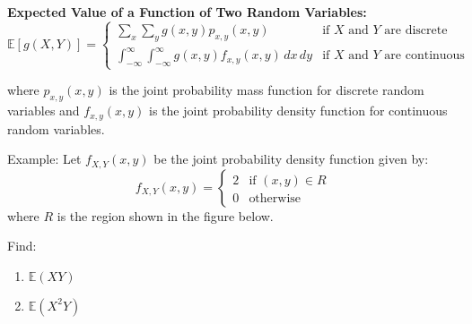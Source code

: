 \documentclass{article}
\begin{document}
    \textbf{Expected Value of a Function of Two Random Variables:}
    \[\mathbb{E}[g(X,Y)] = \begin{cases}
        \displaystyle\sum_{x} \sum_{y} g(x,y)p_{x,y}(x,y) & \text{if } X \text{ and } Y \text{ are discrete} \\[2ex]
        \displaystyle\int_{-\infty}^{\infty}\int_{-\infty}^{\infty} g(x,y)f_{x,y}(x,y) \, dx \, dy & \text{if } X \text{ and } Y \text{ are continuous}
    \end{cases}\]

    where $p_{x,y}(x,y)$ is the joint probability mass function for discrete random variables and $f_{x,y}(x,y)$ is the joint probability density function for continuous random variables.

    Example: Let $f_{X,Y}(x,y)$ be the joint probability density function given by:
    \[f_{X,Y}(x,y) = \begin{cases}
        2 & \text{if } (x,y) \in R \\
        0 & \text{otherwise}
    \end{cases}\]
    where $R$ is the region shown in the figure below.

    Find:
    \begin{enumerate}
        \item $\mathbb{E}(XY)$
        \item $\mathbb{E}(X^2Y)$
    \end{enumerate}

    \begin{center}
    \end{center}
\end{document}
